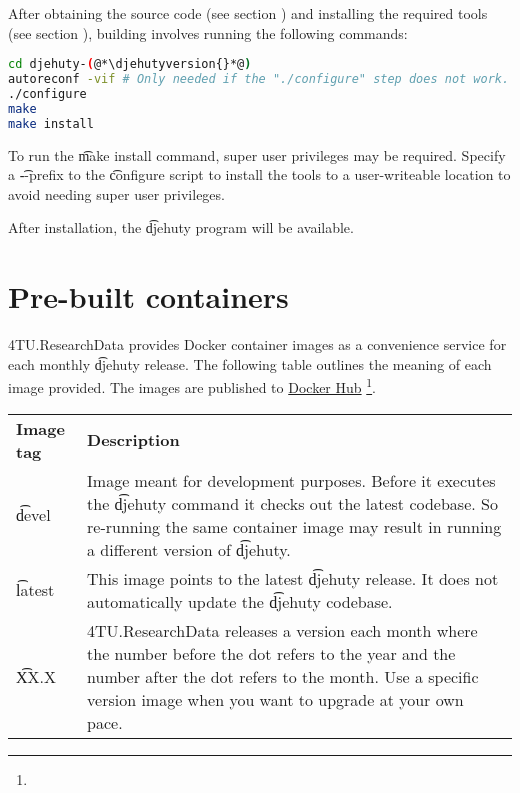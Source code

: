   After obtaining the source code (see section )
  and installing the required tools (see section ),
  building involves running the following commands:

\begin{lstlisting}[language=bash]
cd djehuty-(@*\djehutyversion{}*@)
autoreconf -vif # Only needed if the "./configure" step does not work.
./configure
make
make install
\end{lstlisting}

  To run the \t{make install} command, super user privileges may be
  required.  Specify a \t{-{}-prefix} to the \t{configure}
  script to install the tools to a user-writeable location to avoid
  needing super user privileges.

  After installation, the \t{djehuty} program will be available.

\section{Pre-built containers}

  4TU.ResearchData provides Docker container images as a convenience service
  for each monthly \t{djehuty} release.  The following table outlines the
  meaning of each image provided.  The images are published to
  \href{https://hub.docker.com/r/4turesearchdata/djehuty}{Docker Hub}%
  \footnote{}.

\begin{tabularx}{\textwidth}{*{1}{!{\VRule[-1pt]}l}!{\VRule[-1pt]}X}
  \headrow
  \textbf{Image tag}  & \textbf{Description}\\
  \t{devel}           & Image meant for development purposes.  Before it
                        executes the \t{djehuty} command it checks out the
                        latest codebase.  So re-running the same container
                        image may result in running a different version of
                        \t{djehuty}.\\
  \t{latest}          & This image points to the latest \t{djehuty} release.
                        It does not automatically update the \t{djehuty}
                        codebase.\\
  \t{XX.X}            & 4TU.ResearchData releases a version each month where
                        the number before the dot refers to the year and the
                        number after the dot refers to the month.  Use a
                        specific version image when you want to upgrade at
                        your own pace.
\end{tabularx}

